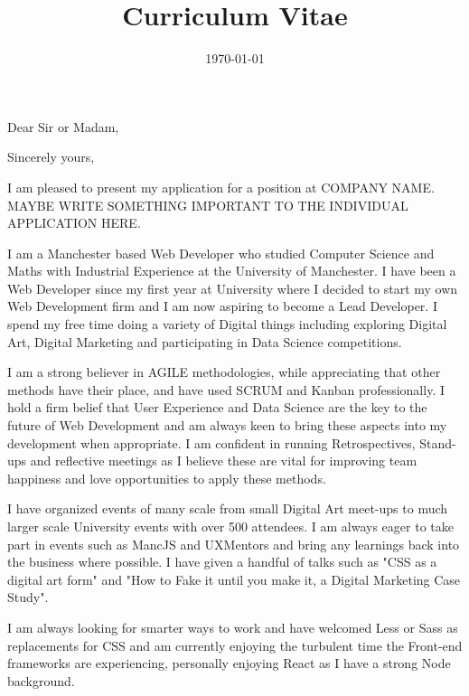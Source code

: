 \documentclass[11pt,a4paper,sans]{moderncv} %
\title{Curriculum Vitae}
\begin{document}


\clearpage

\date{\today} %
\opening{Dear Sir or Madam,} %
\closing{Sincerely yours,} %

\makelettertitle %

I am pleased to present my application for a position at COMPANY NAME. MAYBE WRITE SOMETHING IMPORTANT TO THE INDIVIDUAL APPLICATION HERE.

I am a Manchester based Web Developer who studied Computer Science and Maths with Industrial Experience at the University of Manchester. I have been a Web Developer since my first year at University where I decided to start my own Web Development firm and I am now aspiring to become a Lead Developer. I spend my free time doing a variety of Digital things including exploring Digital Art, Digital Marketing and participating in Data Science competitions.

I am a strong believer in AGILE methodologies, while appreciating that other methods have their place, and have used SCRUM and Kanban professionally. I hold a firm belief that User Experience and Data Science are the key to the future of Web Development and am always keen to bring these aspects into my development when appropriate. I am confident in running Retrospectives, Stand-ups and reflective meetings as I believe these are vital for improving team happiness and love opportunities to apply these methods.

I have organized events of many scale from small Digital Art meet-ups to much larger scale University events with over 500 attendees. I am always eager to take part in events such as MancJS and UXMentors and bring any learnings back into the business where possible. I have given a handful of talks such as "CSS as a digital art form" and "How to Fake it until you make it, a Digital Marketing Case Study".

I am always looking for smarter ways to work and have welcomed Less or Sass as replacements for CSS and am currently enjoying the turbulent time the Front-end frameworks are experiencing, personally enjoying React as I have a strong Node background.
\end{document}
